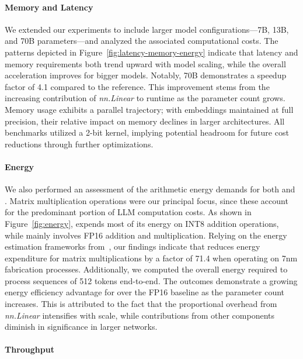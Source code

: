 \paragraph{Memory and Latency}

We extended our experiments to include larger model configurations—7B, 13B, and 70B parameters—and analyzed the associated computational costs. The patterns depicted in Figure~\ref{fig:latency-memory-energy} indicate that latency and memory requirements both trend upward with model scaling, while the overall acceleration improves for bigger models. Notably,  70B demonstrates a speedup factor of 4.1 compared to the  reference. This improvement stems from the increasing contribution of \emph{nn.Linear} to runtime as the parameter count grows. Memory usage exhibits a parallel trajectory; with embeddings maintained at full precision, their relative impact on memory declines in larger architectures. All benchmarks utilized a 2-bit kernel, implying potential headroom for future cost reductions through further optimizations.

\paragraph{Energy}

We also performed an assessment of the arithmetic energy demands for both  and . Matrix multiplication operations were our principal focus, since these account for the predominant portion of LLM computation costs. As shown in Figure~\ref{fig:energy},  expends most of its energy on INT8 addition operations, while  mainly involves FP16 addition and multiplication. Relying on the energy estimation frameworks from~\cite{energycost, pokebnn}, our findings indicate that  reduces energy expenditure for matrix multiplications by a factor of 71.4 when operating on 7nm fabrication processes. Additionally, we computed the overall energy required to process sequences of 512 tokens end-to-end. The outcomes demonstrate a growing energy efficiency advantage for  over the FP16  baseline as the parameter count increases. This is attributed to the fact that the proportional overhead from \emph{nn.Linear} intensifies with scale, while contributions from other components diminish in significance in larger networks.

\paragraph{Throughput}

